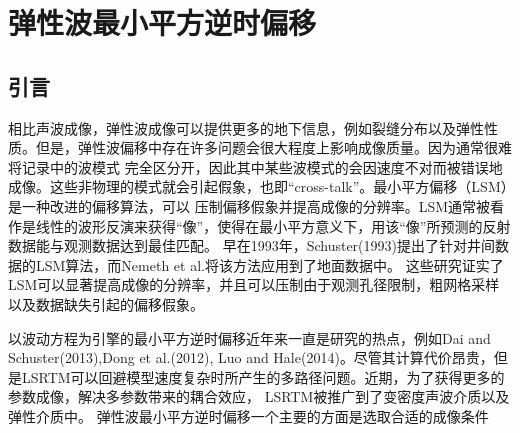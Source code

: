 



\chapter{弹性波最小平方逆时偏移}


\section{引言}
相比声波成像，弹性波成像可以提供更多的地下信息，例如裂缝分布以及弹性性质。但是，弹性波偏移中存在许多问题会很大程度上影响成像质量。因为通常很难将记录中的波模式
完全区分开，因此其中某些波模式的会因速度不对而被错误地成像。这些非物理的模式就会引起假象，也即“cross-talk”。最小平方偏移（LSM）是一种改进的偏移算法，可以
压制偏移假象并提高成像的分辨率。LSM通常被看作是线性的波形反演来获得“像”，使得在最小平方意义下，用该“像”所预测的反射数据能与观测数据达到最佳匹配。
早在1993年，Schuster(1993)\cite{Schuster1993}提出了针对井间数据的LSM算法，而Nemeth et al.\cite{Nemeth1999}将该方法应用到了地面数据中。
这些研究证实了LSM可以显著提高成像的分辨率，并且可以压制由于观测孔径限制，粗网格采样以及数据缺失引起的偏移假象。

以波动方程为引擎的最小平方逆时偏移近年来一直是研究的热点，例如Dai and
Schuster(2013)\cite{Dai2013},Dong et al.(2012)\cite{Dong2012}, Luo and
Hale(2014)\cite{Luo2014}。尽管其计算代价昂贵，但是LSRTM可以回避模型速度复杂时所产生的多路径问题。近期，为了获得更多的参数成像，解决多参数带来的耦合效应，
LSRTM被推广到了变密度声波介质\cite{Yang2017}以及弹性介质中\cite{Duan2016,Feng2016,Xu2016}。
弹性波最小平方逆时偏移一个主要的方面是选取合适的成像条件
